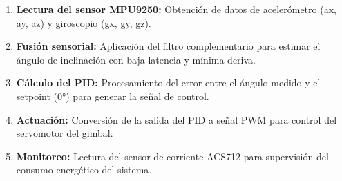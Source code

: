 \documentclass[12pt,letterpaper]{report}
\begin{document}
\begin{enumerate}
    \item \textbf{Lectura del sensor MPU9250:} Obtención de datos de acelerómetro (ax, ay, az) y giroscopio (gx, gy, gz).
    \item \textbf{Fusión sensorial:} Aplicación del filtro complementario para estimar el ángulo de inclinación con baja latencia y mínima deriva.
    \item \textbf{Cálculo del PID:} Procesamiento del error entre el ángulo medido y el setpoint (0°) para generar la señal de control.
    \item \textbf{Actuación:} Conversión de la salida del PID a señal PWM para control del servomotor del gimbal.
    \item \textbf{Monitoreo:} Lectura del sensor de corriente ACS712 para supervisión del consumo energético del sistema.
\end{enumerate}
\end{document}
